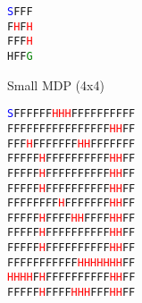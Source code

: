 \documentclass[letter]{article}
\begin{document}
\begin{figure}
    \centering
    \begin{subfigure}{.5\textwidth}
        \centering
        \texttt{\textcolor{blue}{S}FFF}\\
        \texttt{F\textcolor{red}{H}F\textcolor{red}{H}}\\
        \texttt{FFF\textcolor{red}{H}}\\
        \texttt{HFF\textcolor{green}{G}}
        \caption{Small MDP (4x4)}
        \label{fig1:smallmdp}
      \end{subfigure}%
    \begin{subfigure}{.5\textwidth}
      \centering
      \centering
      \texttt{\textcolor{blue}{S}FFFFFF\textcolor{red}{H}\textcolor{red}{H}\textcolor{red}{H}FFFFFFFFFF}\\
      \texttt{FFFFFFFFFFFFFFFF\textcolor{red}{H}\textcolor{red}{H}FF}\\
      \texttt{FFF\textcolor{red}{H}FFFFFFF\textcolor{red}{H}\textcolor{red}{H}FFFFFFF}\\
      \texttt{FFFFF\textcolor{red}{H}FFFFFFFFFF\textcolor{red}{H}\textcolor{red}{H}FF}\\
      \texttt{FFFFF\textcolor{red}{H}FFFFFFFFFF\textcolor{red}{H}\textcolor{red}{H}FF}\\
      \texttt{FFFFF\textcolor{red}{H}FFFFFFFFFF\textcolor{red}{H}\textcolor{red}{H}FF}\\
      \texttt{FFFFFFFF\textcolor{red}{H}FFFFFFF\textcolor{red}{H}\textcolor{red}{H}FF}\\
      \texttt{FFFFF\textcolor{red}{H}FFFF\textcolor{red}{H}\textcolor{red}{H}FFFF\textcolor{red}{H}\textcolor{red}{H}FF}\\
      \texttt{FFFFF\textcolor{red}{H}FFFFFFFFFF\textcolor{red}{H}\textcolor{red}{H}FF}\\
      \texttt{FFFFF\textcolor{red}{H}FFFFFFFFFF\textcolor{red}{H}\textcolor{red}{H}FF}\\
      \texttt{FFFFFFFFFFF\textcolor{red}{H}\textcolor{red}{H}\textcolor{red}{H}\textcolor{red}{H}\textcolor{red}{H}\textcolor{red}{H}\textcolor{red}{H}FF}\\
      \texttt{\textcolor{red}{H}\textcolor{red}{H}\textcolor{red}{H}\textcolor{red}{H}F\textcolor{red}{H}FFFFFFFFFF\textcolor{red}{H}\textcolor{red}{H}FF}\\
      \texttt{FFFFF\textcolor{red}{H}FFFF\textcolor{red}{H}\textcolor{red}{H}\textcolor{red}{H}FFF\textcolor{red}{H}\textcolor{red}{H}FF}\\

\end{subfigure}
\end{figure}
\end{document}
